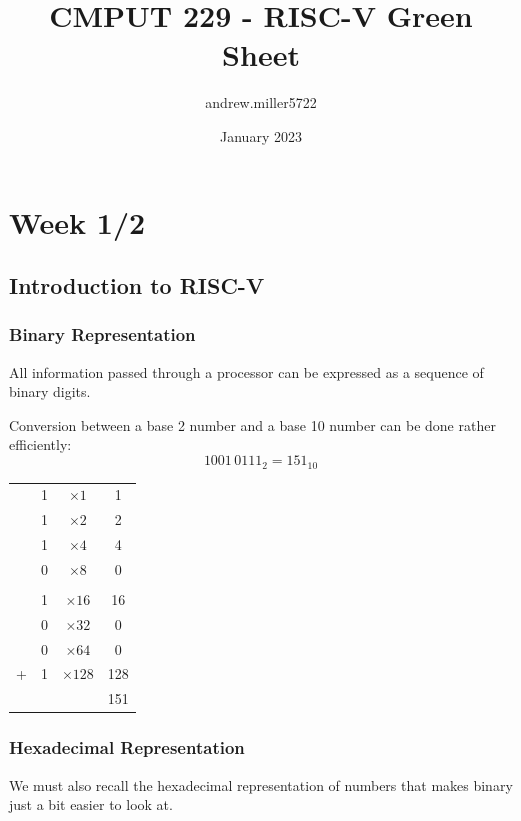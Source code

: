 \documentclass{article}
\title{CMPUT 229 - RISC-V Green Sheet}
\author{andrew.miller5722 }
\date{January 2023}
\begin{document}
	\section{Week 1/2}
	\subsection{Introduction to RISC-V}
	\subsubsection{Binary Representation}
		All information passed through a processor can be expressed as a sequence of binary digits.
		
		Conversion between a base 2 number and a base 10 number can be done rather efficiently:\\
		\begin{equation}
			1001\,0111_2 = 151_{10}
		\end{equation}
	\begin{center}
		\begin{tabular}{c c c c}
			&1 & $\times 1$& 1\\
			&1 & $\times 2$& 2\\
			&1 & $\times 4$& 4\\
			&0 & $\times 8$& 0\\
			&&&\\
			&1 & $\times 16$& 16\\
			&0 & $\times 32$& 0\\
			&0 & $\times 64$& 0\\
			+&1 & $\times 128$& 128\\
			\hline
			& & & 151		 
		\end{tabular}
\end{center}
	\subsubsection{Hexadecimal Representation}
	We must also recall the hexadecimal representation of numbers that makes binary just a bit easier to look at. %
\end{document}
